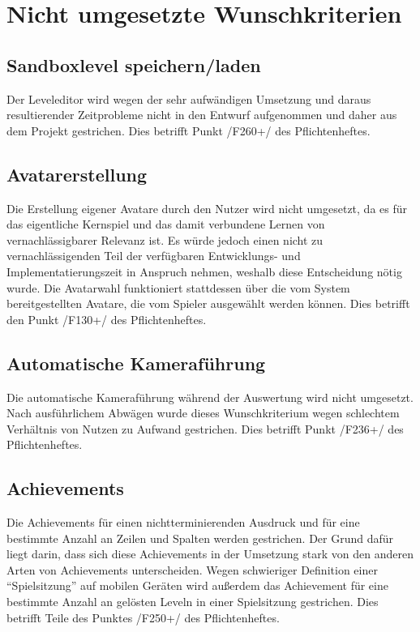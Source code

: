 \chapter{Nicht umgesetzte Wunschkriterien}

\section{Sandboxlevel speichern/laden}
	Der Leveleditor wird wegen der sehr aufwändigen Umsetzung und daraus resultierender Zeitprobleme 
nicht in den Entwurf aufgenommen und daher aus dem Projekt gestrichen.
Dies betrifft Punkt /F260+/ des Pflichtenheftes.  
 
\section{Avatarerstellung}
Die Erstellung eigener Avatare durch den Nutzer wird  nicht umgesetzt, da es für das eigentliche Kernspiel und das damit verbundene Lernen von vernachlässigbarer Relevanz ist.
Es würde jedoch einen nicht zu vernachlässigenden Teil der verfügbaren Entwicklungs- und Implementatierungszeit in Anspruch nehmen, weshalb diese Entscheidung nötig wurde.
Die Avatarwahl funktioniert stattdessen über die vom System bereitgestellten Avatare, die vom Spieler ausgewählt werden können.
Dies betrifft den Punkt /F130+/ des Pflichtenheftes.  

\section{Automatische Kameraführung}
Die automatische Kameraführung während der Auswertung wird nicht umgesetzt.
Nach ausführlichem Abwägen wurde dieses Wunschkriterium wegen schlechtem Verhältnis von Nutzen zu Aufwand gestrichen.
Dies betrifft Punkt /F236+/ des Pflichtenheftes. 

\section{Achievements}
Die Achievements für einen nichtterminierenden Ausdruck und für eine bestimmte Anzahl an Zeilen und Spalten werden gestrichen.
Der Grund dafür liegt darin, dass sich diese Achievements in der Umsetzung stark von den anderen Arten von Achievements unterscheiden.
Wegen schwieriger Definition einer "`Spielsitzung"' auf mobilen Geräten wird außerdem das Achievement für eine bestimmte Anzahl an gelösten Leveln in einer Spielsitzung gestrichen.
Dies betrifft Teile des Punktes /F250+/ des Pflichtenheftes.  
